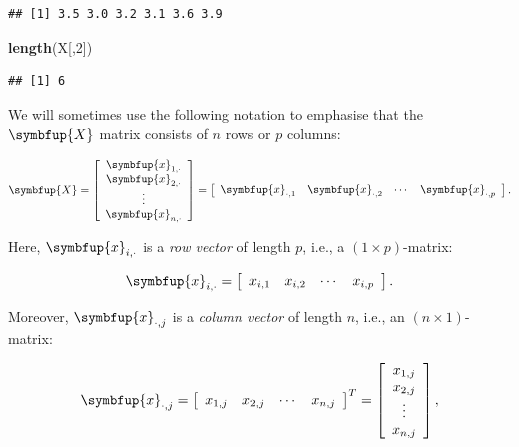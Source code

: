\documentclass[10pt,b5paper,krantz1]{krantz}
\newenvironment{Shaded}{\begin{snugshade}}{\end{snugshade}}
\newcommand{\DecValTok}[1]{\textcolor[rgb]{0.06,0.06,0.06}{#1}}
\newcommand{\KeywordTok}[1]{\textcolor[rgb]{0.27,0.27,0.27}{\textbf{#1}}}
\newcommand{\NormalTok}[1]{#1}
\renewcommand{\mathbf}[1]{\symbfup{#1}}
\begin{document}
\begin{verbatim}
## [1] 3.5 3.0 3.2 3.1 3.6 3.9
\end{verbatim}

\begin{Shaded}
\begin{Highlighting}[]
\KeywordTok{length}\NormalTok{(X[,}\DecValTok{2}\NormalTok{])}
\end{Highlighting}
\end{Shaded}

\begin{verbatim}
## [1] 6
\end{verbatim}

We will sometimes use the following notation to emphasise that
the \(\mathbf{X}\) matrix consists of \(n\) rows
or \(p\) columns:

\[
\mathbf{X}=\left[
\begin{array}{c}
\mathbf{x}_{1,\cdot} \\
\mathbf{x}_{2,\cdot} \\
\vdots\\
\mathbf{x}_{n,\cdot} \\
\end{array}
\right]
=
\left[
\begin{array}{cccc}
\mathbf{x}_{\cdot,1} &
\mathbf{x}_{\cdot,2} &
\cdots &
\mathbf{x}_{\cdot,p} \\
\end{array}
\right].
\]

Here, \(\mathbf{x}_{i,\cdot}\) is a \emph{row vector} of length \(p\),
i.e., a \((1\times p)\)-matrix:

\[
\mathbf{x}_{i,\cdot} = \left[
\begin{array}{cccc}
x_{i,1} &
x_{i,2} &
\cdots &
x_{i,p} \\
\end{array}
\right].
\]

Moreover, \(\mathbf{x}_{\cdot,j}\) is a \emph{column vector} of length \(n\),
i.e., an \((n\times 1)\)-matrix:

\[
\mathbf{x}_{\cdot,j} = \left[
\begin{array}{cccc}
x_{1,j} &
x_{2,j} &
\cdots &
x_{n,j} \\
\end{array}
\right]^T=\left[
\begin{array}{c}
{x}_{1,j} \\
{x}_{2,j} \\
\vdots\\
{x}_{n,j} \\
\end{array}
\right],
\]
\end{document}
